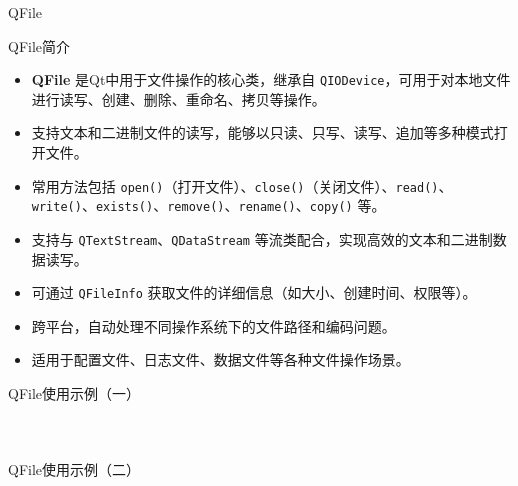 \documentclass[UTF8,aspectratio=169]{beamer}
\begin{document}
\begin{frame}{QFile}
    \begin{ytublock}{QFile简介}
        \begin{itemize}
            \item \textbf{QFile} 是Qt中用于文件操作的核心类，继承自 \texttt{QIODevice}，可用于对本地文件进行读写、创建、删除、重命名、拷贝等操作。
            \item 支持文本和二进制文件的读写，能够以只读、只写、读写、追加等多种模式打开文件。
            \item 常用方法包括 \texttt{open()}（打开文件）、\texttt{close()}（关闭文件）、\texttt{read()}、\texttt{write()}、\texttt{exists()}、\texttt{remove()}、\texttt{rename()}、\texttt{copy()} 等。
            \item 支持与 \texttt{QTextStream}、\texttt{QDataStream} 等流类配合，实现高效的文本和二进制数据读写。
            \item 可通过 \texttt{QFileInfo} 获取文件的详细信息（如大小、创建时间、权限等）。
            \item 跨平台，自动处理不同操作系统下的文件路径和编码问题。
            \item 适用于配置文件、日志文件、数据文件等各种文件操作场景。
        \end{itemize}
    \end{ytublock}
\end{frame}

\begin{frame}[fragile]{QFile使用示例（一）}
    \begin{columns}
        \begin{column}{0.48\textwidth}
            \inputminted[firstline=1,lastline=16]{cpp}{code/qt_file_example.cpp}
        \end{column}
        \begin{column}{0.48\textwidth}
            \inputminted[firstline=17,lastline=33]{cpp}{code/qt_file_example.cpp}
        \end{column}
    \end{columns}
\end{frame}

\begin{frame}[fragile]{QFile使用示例（二）}
    \begin{columns}
        \begin{column}{0.48\textwidth}
            \inputminted[firstline=34,lastline=51]{cpp}{code/qt_file_example.cpp}
        \end{column}
        \begin{column}{0.48\textwidth}
            \inputminted[firstline=52,lastline=67]{cpp}{code/qt_file_example.cpp}
        \end{column}
    \end{columns}
\end{frame}
\end{document}
